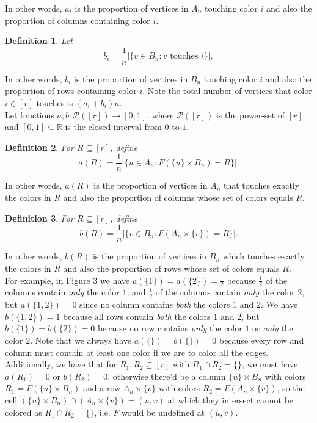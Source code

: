\documentclass{article}
\newtheorem{definition}{Definition}
\begin{document}
\noindent
In other words, $a_i$ is the proportion of vertices in $A_n$ touching color $i$ and also the proportion of columns containing color $i$. 

\begin{definition}
Let $$b_i = \frac{1}{n} |\{v \in B_n : v \text{ touches } i\}|,$$
\end{definition}

\noindent
In other words, $b_i$ is the proportion of vertices in $B_n$ touching color $i$ and also the proportion of rows containing color $i$. Note the total number of vertices that color $i \in [r]$ touches is $(a_i+b_i)n$. \\

Let functions $a,b : \mathcal{P}([r]) \rightarrow [0,1]$, where $\mathcal{P}([r])$ is the power-set of $[r]$ and $[0,1] \subseteq \mathbb{R}$ is the closed interval from $0$ to $1$. \\

\begin{definition}
For $R \subseteq [r]$, define $$a(R) = \frac{1}{n} |\{u \in A_n : F(\{u\} \times B _n) = R\}|.$$
\end{definition}

\noindent
In other words, $a(R)$ is the proportion of vertices in $A_n$ that touches exactly the colors in $R$ and also the proportion of columns whose set of colors equals $R$. \\

\begin{definition}
For $R \subseteq [r]$, define $$b(R) = \frac{1}{n} |\{v \in B_n : F(A_n \times \{v\}) = R\}|.$$
\end{definition}

\noindent
In other words, $b(R)$ is the proportion of vertices in $B_n$ which touches exactly the colors in $R$ and also the proportion of rows whose set of colors equals $R$. \\

For example, in Figure 3 we have $a(\{1\}) = a(\{2\}) = \frac{1}{2}$ because $\frac{1}{2}$ of the columns contain \textit{only} the color $1$, and $\frac{1}{2}$ of the columns contain \textit{only} the color $2$, but $a(\{1,2\}) = 0$ since no column contains \textit{both} the colors $1$ and $2$. We have $b(\{1,2\}) = 1$ because all rows contain \textit{both} the colors $1$ and $2$, but $b(\{1\}) = b(\{2\}) = 0$ because no row contains \textit{only} the color $1$ or \textit{only} the color $2$. Note that we always have $a(\{\}) = b(\{\}) = 0$ because every row and column must contain at least one color if we are to color all the edges. Additionally, we have that for $R_1,R_2 \subseteq [r]$ with $R_1 \cap R_2 = \{\}$, we must have $a(R_1) = 0$ or $b(R_2) = 0$, otherwise there'd be a column $\{u\} \times B _n$ with colors $R_1 = F(\{u\} \times B _n)$ and a row $A_n \times \{v\}$ with colors $R_2 = F(A_n \times \{v\})$, so the cell $(\{u\} \times B _n) \cap (A_n \times \{v\}) = (u,v)$ at which they intersect cannot be colored as $R_1 \cap R_2 = \{\}$, i.e. $F$ would be undefined at $(u,v)$. \\
\end{document}
